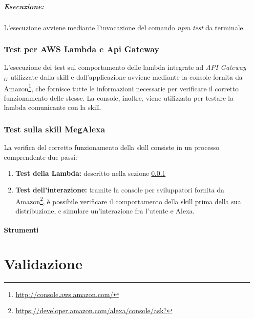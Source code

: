 \subparagraph{Esecuzione:} L'esecuzione avviene mediante l'invocazione del comando \textit{npm test} da terminale. 

\subsubsection{Test per AWS Lambda e Api Gateway}\label{labmdatest}
L'esecuzione dei test sul comportamento delle lambda integrate ad \textit{API Gateway$_{G}$} utilizzate dalla skill e dall'applicazione avviene mediante la console fornita da Amazon\footnote{\url{http://console.aws.amazon.com/}}, che fornisce tutte le informazioni necessarie per verificare il corretto funzionamento delle stesse.
La console, inoltre, viene utilizzata per testare la lambda comunicante con la skill.

\subsubsection{Test sulla skill MegAlexa}
La verifica del corretto funzionamento della skill consiste in un processo comprendente due passi:
\begin{enumerate}
	\item 	\textbf{Test della Lambda:} descritto nella sezione \ref{labmdatest}
	\item \textbf{Test dell'interazione:} tramite la console per sviluppatori fornita da Amazon\footnote{\url{https://developer.amazon.com/alexa/console/ask?}}, è possibile verificare il comportamento della skill prima della sua distribuzione, e simulare un'interazione fra l'utente e Alexa.
\end{enumerate}

\paragraph{Strumenti}
\section{Validazione}

